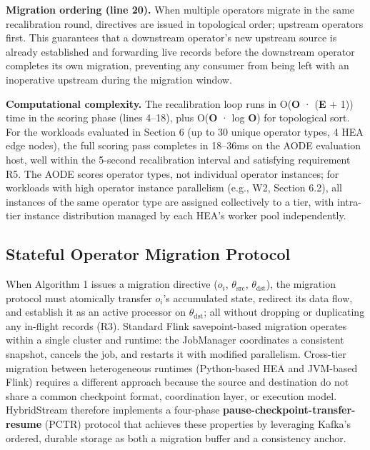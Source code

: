\documentclass[preprint,review,12pt]{elsarticle}
\begin{document}
\textbf{Migration ordering (line 20).} When multiple operators migrate in the same recalibration round, directives are issued in topological order; upstream operators first. This guarantees that a downstream operator's new upstream source is already established and forwarding live records before the downstream operator completes its own migration, preventing any consumer from being left with an inoperative upstream during the migration window.

\textbf{Computational complexity.} The recalibration loop runs in O(\textbar{}\textbf{O}\textbar{} · (\textbar{}\textbf{E}\textbar{} + 1)) time in the scoring phase (lines 4--18), plus O(\textbar{}\textbf{O}\textbar{} · log \textbar{}\textbf{O}\textbar) for topological sort. For the workloads evaluated in Section 6 (up to 30 unique operator types, 4 HEA edge nodes), the full scoring pass completes in 18--36ms on the AODE evaluation host, well within the 5-second recalibration interval and satisfying requirement R5. The AODE scores operator types, not individual operator instances; for workloads with high operator instance parallelism (e.g., W2, Section 6.2), all instances of the same operator type are assigned collectively to a tier, with intra-tier instance distribution managed by each HEA's worker pool independently.

\subsection{Stateful Operator Migration Protocol}\label{stateful-operator-migration-protocol}

When Algorithm 1 issues a migration directive ($o_i$, $\theta_{\text{src}}$, $\theta_{\text{dst}}$), the migration protocol must atomically transfer $o_i$'s accumulated state, redirect its data flow, and establish it as an active processor on $\theta_{\text{dst}}$; all without dropping or duplicating any in-flight records (R3). Standard Flink savepoint-based migration operates within a single cluster and runtime: the JobManager coordinates a consistent snapshot, cancels the job, and restarts it with modified parallelism. Cross-tier migration between heterogeneous runtimes (Python-based HEA and JVM-based Flink) requires a different approach because the source and destination do not share a common checkpoint format, coordination layer, or execution model. HybridStream therefore implements a four-phase \textbf{pause-checkpoint-transfer-resume} (PCTR) protocol that achieves these properties by leveraging Kafka's ordered, durable storage as both a migration buffer and a consistency anchor.
\end{document}
